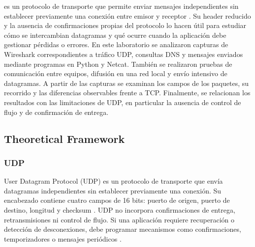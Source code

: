 % 
% 
% 
% 
 es un protocolo de transporte que permite enviar mensajes independientes sin establecer previamente una conexión entre emisor y receptor \cite{kurose2021}. Su header reducido y la ausencia de confirmaciones propias del protocolo lo hacen útil para estudiar cómo se intercambian datagramas y qué ocurre cuando la aplicación debe gestionar pérdidas o errores. En este laboratorio se analizaron capturas de Wireshark correspondientes a tráfico UDP, consultas DNS y mensajes enviados mediante programas en Python y Netcat. También se realizaron pruebas de comunicación entre equipos, difusión en una red local y envío intensivo de datagramas. A partir de las capturas se examinan los campos de los paquetes, su recorrido y las diferencias observables frente a TCP. Finalmente, se relacionan los resultados con las limitaciones de UDP, en particular la ausencia de control de flujo y de confirmación de entrega.




\subsection{Theoretical Framework}

\subsubsection{UDP}
User Datagram Protocol (UDP) es un protocolo de transporte que envía
datagramas independientes sin establecer previamente una conexión. Su encabezado contiene cuatro campos de 16 bits: puerto de origen, puerto de destino, longitud y checksum \cite{rfc768}. UDP no incorpora confirmaciones de entrega, retransmisiones ni control de flujo. Si una aplicación requiere recuperación o detección de desconexiones, debe programar mecanismos como confirmaciones, temporizadores o mensajes periódicos \cite{rfc768,kurose2021}. 

